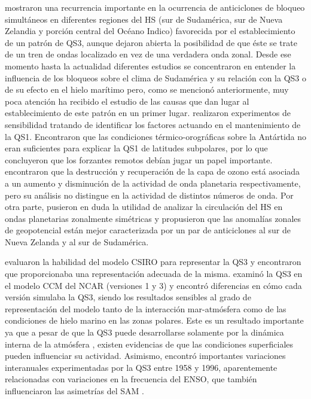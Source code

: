 \documentclass[spanish,a4paper,12pt,oneside]{book}
\begin{document}
\textcite{Trenberth1985} mostraron una recurrencia importante en la
ocurrencia de anticiclones de bloqueo simultáneos en diferentes regiones
del HS (sur de Sudamérica, sur de Nueva Zelandia y porción central del
Océano Indico) favorecida por el establecimiento de un patrón de QS3,
aunque dejaron abierta la posibilidad de que éste se trate de un tren de
ondas localizado en vez de una verdadera onda zonal. Desde ese momento
hasta la actualidad diferentes estudios se concentraron en entender la
influencia de los bloqueos sobre el clima de Sudamérica y su relación
con la QS3 \autocite[ej.][]{Rao2004} o de su efecto en el hielo marítimo
\autocite[ej.][]{Raphael2007} pero, como se mencionó anteriormente, muy
poca atención ha recibido el estudio de las causas que dan lugar al
establecimiento de este patrón en un primer lugar.
\textcite{Quintanar1995} realizaron experimentos de sensibilidad
tratando de identificar los factores actuando en el mantenimiento de la
QS1. Encontraron que las condiciones térmico-orográficas sobre la
Antártida no eran suficientes para explicar la QS1 de latitudes
subpolares, por lo que concluyeron que los forzantes remotos debían
jugar un papel importante. \textcite{Wang2013} encontraron que la
destrucción y recuperación de la capa de ozono está asociada a un
aumento y disminución de la actividad de onda planetaria
respectivamente, pero su análisis no distingue en la actividad de
distintos números de onda. Por otra parte, \textcite{Hobbs2010} pusieron
en duda la utilidad de analizar la circulación del HS en ondas
planetarias zonalmente simétricas y propusieron que las anomalías
zonales de geopotencial están mejor caracterizada por un par de
anticiclones al sur de Nueva Zelanda y al sur de Sudamérica.

\textcite{Cai1999} evaluaron la habilidad del modelo CSIRO para
representar la QS3 y encontraron que proporcionaba una representación
adecuada de la misma. \textcite{Raphael1998} examinó la QS3 en el modelo
CCM del NCAR (versiones 1 y 3) y encontró diferencias en cómo cada
versión simulaba la QS3, siendo los resultados sensibles al grado de
representación del modelo tanto de la interacción mar-atmósfera como de
las condiciones de hielo marino en las zonas polares. Este es un
resultado importante ya que a pesar de que la QS3 puede desarrollarse
solamente por la dinámica interna de la atmósfera
\autocite[ej.][]{Simpson2013}, existen evidencias de que las condiciones
superficiales pueden influenciar su actividad. Asimismo,
\textcite{Raphael2003} encontró importantes variaciones interanuales
experimentadas por la QS3 entre 1958 y 1996, aparentemente relacionadas
con variaciones en la frecuencia del ENSO, que también influenciaron las
asimetrías del SAM \autocite{Fogt2012}.
\end{document}
